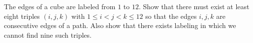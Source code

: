 The edges of a cube are labeled from $1$ to $12$. Show that there must exist at least eight triples $(i, j, k)$ with $1 \leq i < j < k \leq 12$ so that the edges $i, j, k$ are consecutive edges of a path. Also show that there exists labeling in which we cannot find nine such triples.